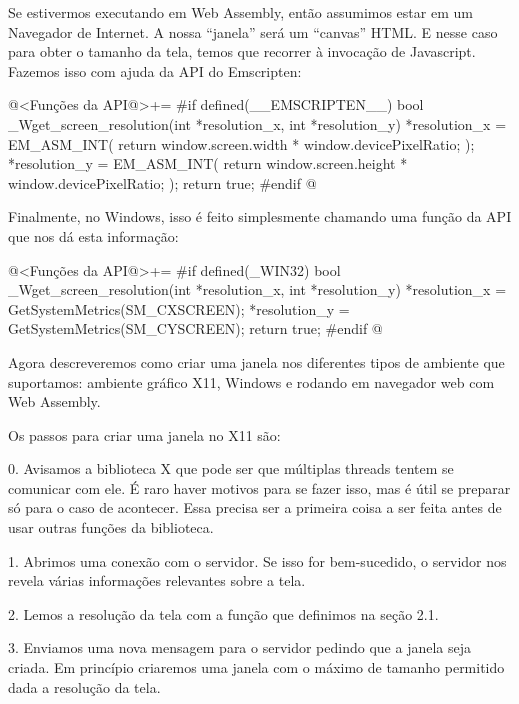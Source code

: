 
Se estivermos executando em Web Assembly, então assumimos estar em um
Navegador de Internet. A nossa ``janela'' será um ``canvas'' HTML. E
nesse caso para obter o tamanho da tela, temos que recorrer à
invocação de Javascript. Fazemos isso com ajuda da API do Emscripten:

\iniciocodigo
@<Funções da API@>+=
#if defined(__EMSCRIPTEN__)
bool _Wget_screen_resolution(int *resolution_x, int *resolution_y){
  *resolution_x = EM_ASM_INT({
    return window.screen.width * window.devicePixelRatio;
  });
  *resolution_y = EM_ASM_INT({
    return window.screen.height * window.devicePixelRatio;
  });
  return true;
}
#endif
@
\fimcodigo



Finalmente, no Windows, isso é feito simplesmente chamando uma função
da API que nos dá esta informação:

\iniciocodigo
@<Funções da API@>+=
#if defined(_WIN32)
bool _Wget_screen_resolution(int *resolution_x, int *resolution_y){
  *resolution_x = GetSystemMetrics(SM_CXSCREEN);
  *resolution_y = GetSystemMetrics(SM_CYSCREEN);
  return true;
}
#endif
@
\fimcodigo


Agora descreveremos como criar uma janela nos diferentes tipos de
ambiente que suportamos: ambiente gráfico X11, Windows e rodando em
navegador web com Web Assembly.


Os passos para criar uma janela no X11 são:

0. Avisamos a biblioteca X que pode ser que múltiplas threads tentem
se comunicar com ele. É raro haver motivos para se fazer isso, mas é
útil se preparar só para o caso de acontecer. Essa precisa ser a
primeira coisa a ser feita antes de usar outras funções da biblioteca.

1. Abrimos uma conexão com o servidor. Se isso for bem-sucedido, o
servidor nos revela várias informações relevantes sobre a tela.

2. Lemos a resolução da tela com a função que definimos na seção 2.1.

3. Enviamos uma nova mensagem para o servidor pedindo que a janela
seja criada. Em princípio criaremos uma janela com o máximo de tamanho
permitido dada a resolução da tela.

